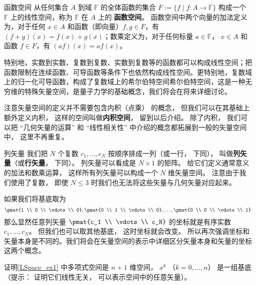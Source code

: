 \begin{example}{函数空间}\label{LSpace_ex2}
从任何集合 $A$ 到域 $\mathbb{F}$ 的全体函数的集合 $F := \{f \mid f: A \to \mathbb{F} \}$ 构成一个 $\mathbb{F}$ 上的线性空间，称为 $\mathbb{F}$ 在 $A$ 上的 \textbf{函数空间}。 函数空间中两个向量的加法定义为，对于任何 $x \in A$ 和函数（即向量）$f, g\in F$，有 $(f+g)(x)=f(x)+g(x)$；数乘定义为，对于任何标量 $a \in \mathbb{F}$， $x \in A$ 和函数 $f \in F$，有 $(af)(x)=af(x)$。

特别地，实数到实数、复数到复数、实数到复数等的函数都可以构成线性空间；把函数限制在连续函数、可导函数等条件下也依然构成线性空间。更特别地，复数域上的归一化可导函数，构成了复数域上的希尔伯特空间希尔伯特空间，这是一种无穷维的特殊矢量空间，是量子力学的基础概念，我们将会在将来详细讨论。
\end{example}

注意矢量空间的定义并不需要包含内积（点乘） 的概念， 但我们可以在其基础上额外定义内积， 这样的空间叫做\textbf{内积空间}， 留到以后介绍。 除了内积， 我们可以把 “几何矢量的运算” 和 “线性相关性” 中介绍的概念都拓展到一般的矢量空间中， 这里不再重复。


\begin{exercise}{列矢量}
我们把 $N$ 个复数 $c_1, \dots, c_N$ 按顺序排成一列（或一行， 下同）， 叫做\textbf{列矢量}（或\textbf{行矢量}， 下同）。 列矢量可以看成是 $N \times 1$ 的矩阵。 给它们定义通常意义的加法和数乘运算， 这样所有列矢量可以构成一个 $N$ 维矢量空间。 注意由于我们使用了复数， 即使 $N \leqslant 3$ 时我们也无法将这些矢量与几何矢量对应起来。

如果我们将基底取为
$$
\pmat{1 \\ 0 \\ \vdots \\ 0}, \pmat{0 \\ 1 \\ \vdots \\ 0}, \dots, \pmat{0 \\ 0 \\ \vdots \\ 1}
$$
那么显然任意列矢量 $\pmat{c_1 \\ \vdots \\ c_N}$ 的坐标就是有序实数 $c_1, \dots, c_N$。 但我们也可以取其他基底， 这时坐标就会改变。 所以再次强调坐标和矢量本身是不同的。我们将会在矢量空间的表示中详细区分矢量本身和矢量的坐标这两个概念。
\end{exercise}

\begin{exercise}{}
证明\autoref{LSpace_ex1} 中多项式空间是 $n+1$ 维空间， $x^k$ （$k = 0, \dots, n$） 是一组基底（提示： 证明它们线性无关， 可以表示空间中的任意矢量）。
\end{exercise}





